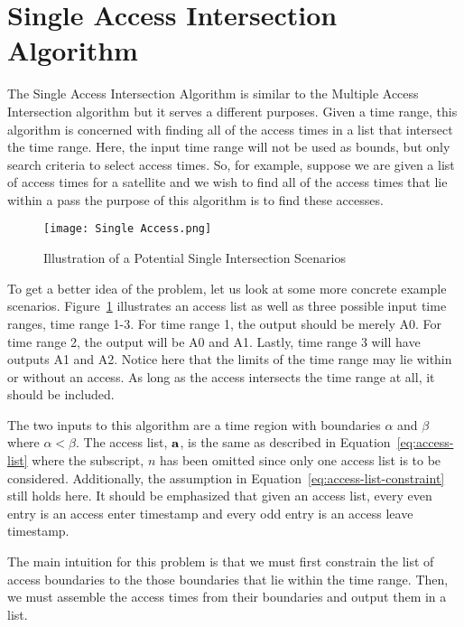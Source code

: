 
\section{Single Access Intersection Algorithm} \label{alg:contains}

The Single Access Intersection Algorithm is similar to the Multiple Access
Intersection algorithm but it serves a different purposes. Given a time range,
this algorithm is concerned with finding all of the access times in a list that
intersect the time range. Here, the input time range will not be used as
bounds, but only search criteria to select access times. So, for example,
suppose we are given a list of access times for a satellite and we wish to find
all of the access times that lie within a pass the purpose of this algorithm is
to find these accesses. 


\begin{figure}[h]
    \centering
    \texttt{[image: Single Access.png]} 
    \caption{Illustration of a Potential Single Intersection Scenarios}
    \label{fig:single-access-intersect}
\end{figure}

To get a better idea of the problem, let us look at some more concrete example
scenarios. Figure~\ref{fig:single-access-intersect} illustrates an access list
as well as three possible input time ranges, time range 1-3. For time range 1,
the output should be merely A0. For time range 2, the output will be A0 and A1.
Lastly, time range 3 will have outputs A1 and A2. Notice here that the limits
of the time range may lie within or without an access. As long as the access
intersects the time range at all, it should be included.

The two inputs to this algorithm are a time region with boundaries $\alpha$ and
$\beta$ where $\alpha < \beta$. The access list, $\bm{\mathrm{a}}$, is the same as
described in Equation~\ref{eq:access-list} where the subscript, $n$ has been
omitted since only one access list is to be considered. Additionally, the
assumption in Equation~\ref{eq:access-list-constraint} still holds here. It
should be emphasized that given an access list, every even entry is an access
enter timestamp and every odd entry is an access leave timestamp.

The main intuition for this problem is that we must first constrain the list of
access boundaries to the those boundaries that lie within the time range.
Then, we must assemble the access times from their boundaries and output them
in a list.  

